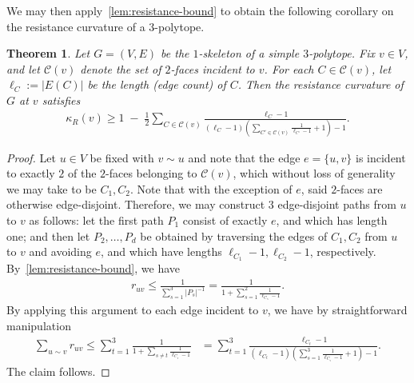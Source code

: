 \documentclass[11pt,a4paper]{amsart}
\newcommand{\resistance}[1]{\kappa_R\left({#1}\right)}
\newtheorem{theorem}{Theorem}[section]
\begin{document}
We may then apply~\cref{lem:resistance-bound} to obtain the following corollary on the resistance curvature of a $3$-polytope.

\begin{theorem}\label{thm:curvature-bound}
    Let $G=(V,E)$ be the $1$-skeleton of a simple $3$-polytope. Fix $v\in V$, and let $\mathcal{C
    }(v)$ denote the set of $2$-faces incident to $v$. For each $C\in\mathcal{C}(v)$, let $\ell_C := |E(C)|$ be the length (edge count) of $C$. Then the resistance curvature of $G$ at $v$ satisfies
        \begin{align*}
            \resistance{v} \geq
            1 \;-\; \frac{1}{2}\sum_{C\in\mathcal{C}(v)}
            \frac{\ell_C-1}{
                (\ell_C-1)\!\left(\sum_{C'\in\mathcal{C}(v)}\frac{1}{\ell_{C'}-1}+1\right)-1}.
        \end{align*}
\end{theorem}

\begin{proof}
    Let $u\in V$ be fixed with $v\sim u$ and note that the edge $e = \{u, v\}$ is incident to exactly $2$ of the $2$-faces belonging to $\mathcal{C}(v)$, which without loss of generality we may take to be $C_1, C_{2}$. Note that with the exception of $e$, said $2$-faces are otherwise edge-disjoint. Therefore, we may construct $3$ edge-disjoint paths from $u$ to $v$ as follows: let the first path $P_1$ consist of exactly $e$, and which has length one; and then let $P_2,\dotsc, P_d$ be obtained by traversing the edges of $C_1,C_2$ from $u$ to $v$ and avoiding $e$, and which have lengths $\ell_{C_1}-1, \ell_{C_2}-1$, respectively. By~\cref{lem:resistance-bound}, we have
        \begin{align*}
            r_{uv} \leq \frac{1}{\sum_{s=1}^{3} |P_s|^{-1}} = \frac{1}{1 + \sum_{s=1}^{2}\frac{1}{\ell_{C_s} - 1}}.
        \end{align*}
    By applying this argument to each edge incident to $v$, we have by straightforward manipulation
        \begin{align*}
            \sum_{u\sim v} r_{uv} \leq \sum_{t=1}^{3} \frac{1}{ 1 + \sum_{s\neq t}\frac{1}{\ell_{C_s} - 1}} &= \sum_{t=1}^{3} \frac{\ell_{C_t} - 1}{ (\ell_{C_t} - 1)(\sum_{s=1}^{3} \frac{1}{\ell_{C_s} - 1}+1) - 1}.
        \end{align*}
    The claim follows.
\end{proof}
\end{document}
